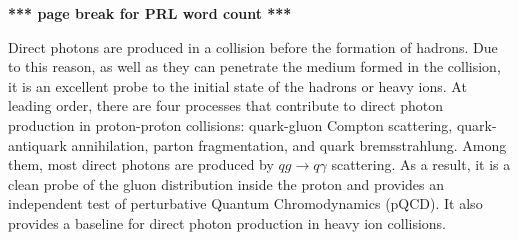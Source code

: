 \documentclass[twocolumn,letterpaper,aps,prl,longbibliography,superscriptaddress,floatfix]{revtex4-2}
\newcommand{\ALL}{\ensuremath{A_{LL}}}
\begin{document}

\textbf{*** page break for PRL word count ***}  \clearpage

Direct photons are produced in a collision before the formation of hadrons. Due to this reason, as well as they can penetrate the medium formed in the collision, it is an excellent probe to the initial state of the hadrons or heavy ions. At leading order, there are four processes that contribute to direct photon production in proton-proton collisions: quark-gluon Compton scattering, quark-antiquark annihilation, parton fragmentation, and quark bremsstrahlung. Among them, most direct photons are produced by $qg \rightarrow q\gamma$ scattering. As a result, it is a clean probe of the gluon distribution inside the proton and provides an independent test of perturbative Quantum Chromodynamics (pQCD). It also provides a baseline for direct photon production in heavy ion collisions.
\end{document}
